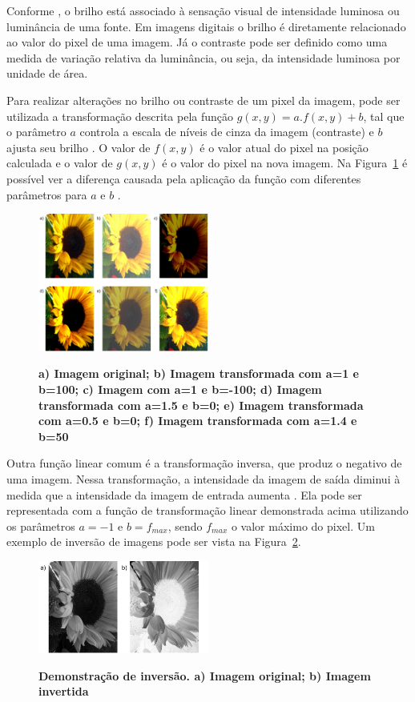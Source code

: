 \documentclass[12pt,oneside,a4paper,english,french,spanish,brazil,]{abntex2}
\begin{document}
Conforme \citet{pedrini:2008}, o brilho está associado à sensação visual de intensidade luminosa ou luminância de uma fonte. Em imagens digitais o brilho é diretamente relacionado ao valor do pixel de uma imagem. Já o contraste pode ser definido como uma medida de variação relativa da luminância, ou seja, da intensidade luminosa por unidade de área.

Para realizar alterações no brilho ou contraste de um pixel da imagem, pode ser utilizada a transformação descrita pela função \(g(x,y)=a.f(x,y)+b\), tal que o parâmetro \(a\) controla a escala de níveis de cinza da imagem (contraste) e \(b\) ajusta seu brilho \cite{pedrini:2008}. O valor de \(f(x,y)\) é o valor atual do pixel na posição calculada e o valor de \(g(x,y)\) é o valor do pixel na nova imagem. Na Figura~\ref{fig:PDI_Brilho_e_Contraste} é possível ver a diferença causada pela aplicação da função com diferentes parâmetros para \(a\) e \(b\) \cite{pedrini:2008}.

\begin{figure}[ht]
\centering
\caption{\textbf{a) Imagem original; b) Imagem transformada com a=1 e b=100; c) Imagem com a=1 e b=-100; d) Imagem transformada com a=1.5 e b=0; e) Imagem transformada com a=0.5 e b=0; f) Imagem transformada com a=1.4 e b=50}}
\includegraphics[width=0.5\textwidth]{imagens/PDI_Brilho_e_Contraste.pdf}
\sourceAuthor
\label{fig:PDI_Brilho_e_Contraste}
\end{figure}

Outra função linear comum é a transformação inversa, que produz o negativo de uma imagem. Nessa transformação, a intensidade da imagem de saída diminui à medida que a intensidade da imagem de entrada aumenta \cite{pedrini:2008}. Ela pode ser representada com a função de transformação linear demonstrada acima utilizando os parâmetros \(a=-1\) e \(b=f_{max}\), sendo \(f_{max}\) o valor máximo do pixel. Um exemplo de inversão de imagens pode ser vista na Figura~\ref{fig:PDI_Inversao}.

\begin{figure}[ht]
\centering
\caption{\textbf{Demonstração de inversão. a) Imagem original; b) Imagem invertida}}
\includegraphics[width=0.5\textwidth]{imagens/PDI_Inversao.pdf}
\sourceAuthor
\label{fig:PDI_Inversao}
\end{figure}
\end{document}
